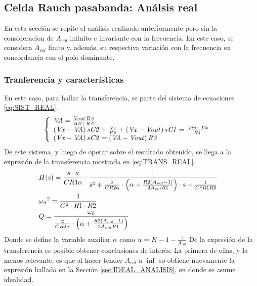 \subsection{Celda Rauch pasabanda: An\'alsis real}
En esta secci\'on se repite el an\'alisis realizado anteriormente pero sin la consideracion de $A_{vol}$ infinito e invariante con la frecuencia. En este caso, se considera $A_{vol}$ finito y, adem\'as, su respectiva variaci\'on con la frecuencia en concordancia con el polo dominante.


\subsubsection{Tranferencia y caracter\'isticas}
En este caso, para hallar la transferencia, se parte del sistema de ecuaciones \ref{eq:SIST_REAL}.
\begin{equation}
    \left\{
        \begin{array}{lll}
            {\it VA}={\frac {{\it Vout}\,{\it RA}}{{\it RB}+{\it RA}}}\\
            \left( {\it Vx}-{\it VA} \right) s{\it C2}+{\frac {{\it Vx}}{{\it R2}
            }}+ \left( {\it Vx}-{\it Vout} \right) s{\it C1}={\frac {{\it Vin}-{
            \it Vx}}{{\it R1}}}\\
            \left( {\it Vx}-{\it VA} \right) s{\it C2}= \left( {\it VA}-{\it Vout
            } \right) {\it R3}

        \end{array}
    \right.
    \label{eq:SIST_REAL}
\end{equation}
De este sistema, y luego de operar sobre el resultado obtenido, se llega a la expresi\'on de la transferencia mostrada en \ref{eq:TRANS_REAL}.
\begin{equation}
    \begin{split}
        &H(s) = \frac{s\cdot a}{C R1 \alpha} \cdot \frac{1}{s^2+\frac{2}{C R2 \alpha}\cdot \left(\alpha + \frac{R2(A_{vol}-1)}{2 A_{vol} R1} \right)\cdot s +\frac{1}{C^2 R1 R2}}\\
        &{{\it \omega_0}}^2=\frac{1}{C^2\cdot R1 \cdot R2}\\
        &Q = \frac{ \omega_0}{\frac{2}{C R2 \alpha}\cdot \left(\alpha + \frac{R2(A_{vol}-1)}{2 A_{vol} R1} \right)}
    \end{split}
    \label{eq:TRANS_REAL}
\end{equation}
Donde se define la variable auxiliar $\alpha$ como $\alpha = K-1-\frac{1}{A_{vol}}$
De la expresi\'on de la transferencia es posible obtener conclusiones de inter\'es. La primera de ellas, y la menos relevante, es que al hacer tender $A_{vol}$ a $\inf $ so obtiene nuevamente la expresi\'on hallada en la Secci\'on \ref{sec:IDEAL_ANALISIS}, en donde se asume idealidad.

